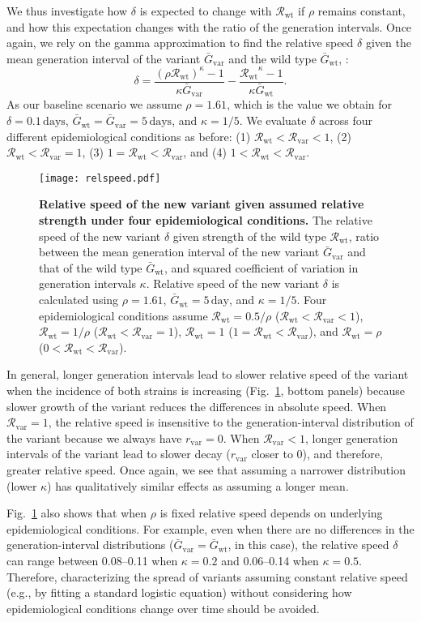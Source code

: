 \documentclass[12pt]{article}
\newcommand{\fref}[1]{Fig.~\ref{fig:#1}}
\newcommand{\vvvar}{\mathrm{var}}
\newcommand{\wwwt}{\mathrm{wt}}
\newcommand{\rx}[1]{\ensuremath{{r}_{#1}}\xspace}
\newcommand{\rv}{\rx{\vvvar}}
\newcommand{\Rx}[1]{\ensuremath{{\mathcal R}_{#1}}\xspace}
\newcommand{\Rw}{\Rx{\wwwt}}
\newcommand{\Rv}{\Rx{\vvvar}}
\newcommand{\days}{\ensuremath{\, \textrm{day}}}
\newcommand{\Gx}[1]{\ensuremath{{\bar G}_{#1}}\xspace}
\newcommand{\Gw}{\Gx{\wwwt}}
\newcommand{\Gv}{\Gx{\vvvar}}
\begin{document}
We thus investigate how $\delta$ is expected to change with \Rw if $\rho$ remains constant, and how this expectation changes with the ratio of the generation intervals. 
Once again, we rely on the gamma approximation to find the relative speed $\delta$ given the mean generation interval of the variant $\Gv$ and the wild type $\Gw$, :
\begin{equation}
\delta = \frac{(\rho \Rw)^{\kappa} - 1}{\kappa \Gv} - \frac{\Rw^{\kappa} - 1}{\kappa \Gw}.
\end{equation}
As our baseline scenario we assume $\rho = 1.61$, which is the value we obtain for $\delta=0.1\,\textrm{days}$, $\Gw = \Gv = 5\,\textrm{days}$, and $\kappa = 1/5$.
We evaluate $\delta$ across four different epidemiological conditions as before: (1) $\Rw < \Rv < 1$, (2) $\Rw < \Rv = 1$, (3) $1 = \Rw < \Rv$, and (4) $1 < \Rw < \Rv$.

\begin{figure}[!th]
\texttt{[image: relspeed.pdf]}
\caption{
\textbf{Relative speed of the new variant given assumed relative strength under four epidemiological conditions.}
The relative speed of the new variant $\delta$ given strength of the wild type $\Rw$, ratio between the mean generation interval of the new variant $\Gv$ and that of the wild type $\Gw$, and squared coefficient of variation in generation intervals $\kappa$.
Relative speed of the new variant $\delta$ is calculated using $\rho=1.61$, $\Gw = 5\days$, and $\kappa = 1/5$.
Four epidemiological conditions assume $\Rw=0.5/\rho$ ($\Rw < \Rv < 1$), $\Rw=1/\rho$ ($\Rw < \Rv = 1$), $\Rw=1$ ($1 = \Rw < \Rv$), and $\Rw=\rho$ ($0 < \Rw < \Rv$).
}
\label{fig:relspeed}
\end{figure}

In general, longer generation intervals lead to slower relative speed of the variant when the incidence of both strains is increasing (\fref{relspeed}, bottom panels) because slower growth of the variant reduces the differences in absolute speed.
When $\Rv=1$, the relative speed is insensitive to the generation-interval distribution of the variant because we always have $\rv=0$.
When $\Rv<1$, longer generation intervals of the variant lead to slower decay ($\rv$ closer to 0), and therefore, greater relative speed.
Once again, we see that assuming a narrower distribution (lower $\kappa$) has qualitatively similar effects as assuming a longer mean.

\fref{relspeed} also shows that when $\rho$ is fixed relative speed depends on underlying epidemiological conditions. 
For example, even when there are no differences in the generation-interval distributions ($\Gv=\Gw$, in this case), the relative speed $\delta$ can range between 0.08--0.11 when $\kappa=0.2$ and 0.06--0.14 when $\kappa=0.5$.
Therefore, characterizing the spread of variants assuming constant relative speed (e.g., by fitting a standard logistic equation) without considering how epidemiological conditions change over time should be avoided.
\end{document}
